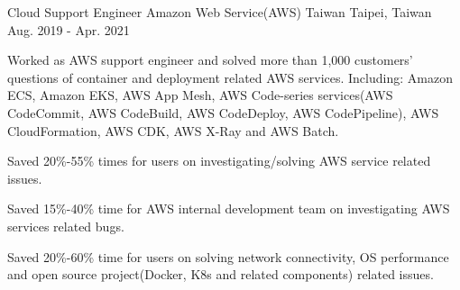 \begin{cventries}
    \cventry
        {Cloud Support Engineer}
        {Amazon Web Service(AWS) Taiwan}
        {Taipei, Taiwan}
        {Aug. 2019 - Apr. 2021}
        {
            \begin{cvitems}
                \item
                {
                    Worked as AWS support engineer and solved more than 1,000 customers' questions of container and deployment related AWS services. Including: Amazon ECS, Amazon EKS, AWS App Mesh, AWS Code-series services(AWS CodeCommit, AWS CodeBuild, AWS CodeDeploy, AWS CodePipeline), AWS CloudFormation, AWS CDK, AWS X-Ray and AWS Batch.
                }
                \item
                {
                    Saved 20\%-55\% times for users on investigating/solving AWS service related issues.
                }
                \item
                {
                    Saved 15\%-40\% time for AWS internal development team on investigating AWS services related bugs.
                }
                \item
                {
                    Saved 20\%-60\% time for users on solving network connectivity, OS performance and open source project(Docker, K8s and related components) related issues.
                }
            \end{cvitems}
        }


\end{cventries}
